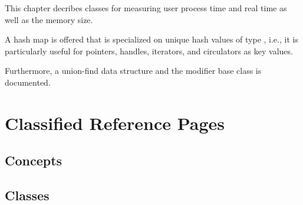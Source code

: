 %
%
\label{chap:union_find}
\label{chap:hash_map}


This chapter decribes classes for measuring user process time and real time
as well as the memory size.

A hash map  is offered that is specialized
on unique hash values of type , i.e., it is
particularly useful for pointers, handles, iterators, and circulators
as key values.

Furthermore, a union-find data structure and the modifier base class
is documented.

\section{Classified Reference Pages}

\subsection*{Concepts}


\subsection*{Classes}

 \\
 \\

\\



